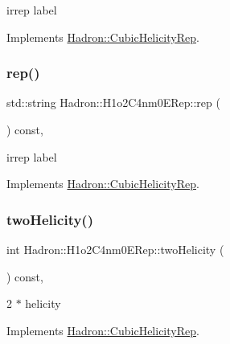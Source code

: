 irrep label 

Implements \mbox{\hyperlink{structHadron_1_1CubicHelicityRep_a8cdd86f068a167dc96faef02bfb8a33d}{Hadron\+::\+Cubic\+Helicity\+Rep}}.

\mbox{\label{structHadron_1_1H1o2C4nm0ERep_aec9bc604007b15cc42d00f7e75bba38a}} 
\subsubsection{\texorpdfstring{rep()}{rep()}\hspace{0.1cm}{\footnotesize\ttfamily [3/3]}}
{\footnotesize\ttfamily std\+::string Hadron\+::\+H1o2\+C4nm0\+E\+Rep\+::rep (\begin{DoxyParamCaption}{ }\end{DoxyParamCaption}) const\hspace{0.3cm}{\ttfamily [inline]}, {\ttfamily [virtual]}}

irrep label 

Implements \mbox{\hyperlink{structHadron_1_1CubicHelicityRep_a8cdd86f068a167dc96faef02bfb8a33d}{Hadron\+::\+Cubic\+Helicity\+Rep}}.

\mbox{\label{structHadron_1_1H1o2C4nm0ERep_a083d0736946f0404ac8639fd8a954a9d}} 
\subsubsection{\texorpdfstring{twoHelicity()}{twoHelicity()}\hspace{0.1cm}{\footnotesize\ttfamily [1/3]}}
{\footnotesize\ttfamily int Hadron\+::\+H1o2\+C4nm0\+E\+Rep\+::two\+Helicity (\begin{DoxyParamCaption}{ }\end{DoxyParamCaption}) const\hspace{0.3cm}{\ttfamily [inline]}, {\ttfamily [virtual]}}

2 $\ast$ helicity 

Implements \mbox{\hyperlink{structHadron_1_1CubicHelicityRep_af507aa56fc2747eacc8cb6c96db31ecc}{Hadron\+::\+Cubic\+Helicity\+Rep}}.

\mbox{\label{structHadron_1_1H1o2C4nm0ERep_a083d0736946f0404ac8639fd8a954a9d}} 
